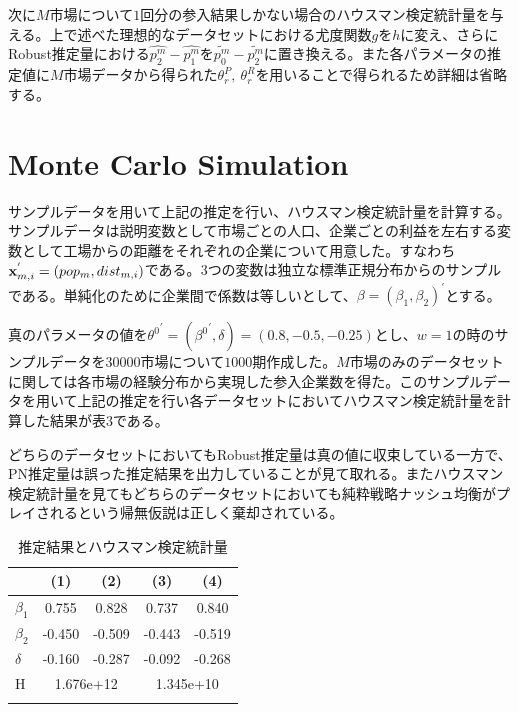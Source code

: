 \documentclass{jsarticle}
\begin{document}
次に$M$市場について$1$回分の参入結果しかない場合のハウスマン検定統計量を与える。上で述べた理想的なデータセットにおける尤度関数$g$を$h$に変え、さらにRobust推定量における$\hat{p_2^m} - \hat{p_1^m}$を$\tilde{p_0^m} - \tilde{p_2^m}$に置き換える。また各パラメータの推定値に$M$市場データから得られた$\theta_r^P,\ \theta_r^R$を用いることで得られるため詳細は省略する。

\section{Monte Carlo Simulation}
サンプルデータを用いて上記の推定を行い、ハウスマン検定統計量を計算する。サンプルデータは説明変数として市場ごとの人口、企業ごとの利益を左右する変数として工場からの距離をそれぞれの企業について用意した。すなわち${\bf x}_{m, i}^{'} = (pop_m, dist_{m, i})$である。$3$つの変数は独立な標準正規分布からのサンプルである。単純化のために企業間で係数は等しいとして、$\beta = (\beta_1, \beta_2)^{'}$とする。

真のパラメータの値を${\theta^0}^{'} = ({\beta^0}^{'}, \delta) = (0.8, -0.5, -0.25)$とし、$w = 1$の時のサンプルデータを$30000$市場について$1000$期作成した。$M$市場のみのデータセットに関しては各市場の経験分布から実現した参入企業数を得た。このサンプルデータを用いて上記の推定を行い各データセットにおいてハウスマン検定統計量を計算した結果が表$3$である。

どちらのデータセットにおいてもRobust推定量は真の値に収束している一方で、PN推定量は誤った推定結果を出力していることが見て取れる。またハウスマン検定統計量を見てもどちらのデータセットにおいても純粋戦略ナッシュ均衡がプレイされるという帰無仮説は正しく棄却されている。

\begin{table}[t]
\begin{minipage}{\textwidth}
\centering
\def\sym#1{\ifmmode^{#1}\else\(^{#1}\)\fi}
\caption{推定結果とハウスマン検定統計量}
\begin{tabular}{l*{4}{c}}
\hline\hline
            &\multicolumn{1}{c}{(1)}&\multicolumn{1}{c}{(2)}&\multicolumn{1}{c}{(3)}&\multicolumn{1}{c}{(4)}\\
\hline
$\beta_1$&        0.755         &       0.828        &      0.737  &     0.840  \\
[1em]
$\beta_2$      &        -0.450          &       -0.509        &       -0.443        &       -0.519         \\
[1em]
$\delta$&        -0.160         &       -0.287        &       -0.092         &       -0.268        \\
\hline
H      &        \multicolumn{2}{c}{1.676e+12}       &         \multicolumn{2}{c}{1.345e+10}        \\
\hline\hline\\
\end{tabular}
\end{minipage}
\end{table}
\end{document}
